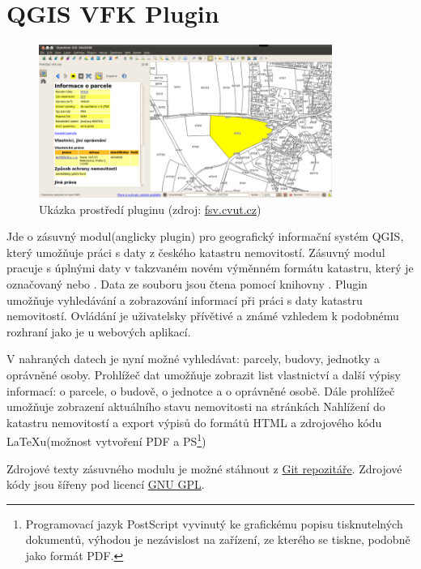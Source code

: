 \section{QGIS VFK Plugin}
\begin{figure}[H]
	 \centering
      \includegraphics[height=5cm]{./pictures/Qgisvfkplugin.png}
      \caption{Ukázka prostředí pluginu (zdroj:
\href{http://freegis.fsv.cvut.cz/wiki/images/4/4b/Qgisvfkplugin-screenshot-05.png}{fsv.cvut.cz})}
      \label{fig:qgis_vfk_plugin}
  \end{figure}

Jde o zásuvný modul(anglicky plugin) pro geografický informační systém QGIS, který umožňuje práci s daty z českého katastru nemovitostí. Zásuvný modul pracuje s úplnými daty v takzvaném novém výměnném formátu katastru, který je označovaný  nebo . Data ze souboru jsou čtena pomocí knihovny . Plugin umožňuje vyhledávání a zobrazování informací při práci s daty katastru nemovitostí. Ovládání je uživatelsky přívětivé a známé vzhledem k podobnému rozhraní jako je u webových aplikací.

V nahraných datech je nyní možné vyhledávat: parcely, budovy, jednotky a oprávněné osoby. Prohlížeč dat umožňuje zobrazit list vlastnictví a další výpisy informací: o parcele, o budově, o jednotce a o oprávněné osobě. Dále prohlížeč umožňuje zobrazení aktuálního stavu nemovitosti na stránkách Nahlížení do katastru nemovitostí a export výpisů do formátů HTML a zdrojového kódu LaTeXu(možnost vytvoření PDF a PS\footnote{Programovací jazyk PostScript vyvinutý ke grafickému popisu tisknutelných dokumentů, výhodou je nezávislost na zařízení, ze kterého se tiskne, podobně jako formát PDF.\cite{PostScript}})

Zdrojové texty zásuvného modulu je možné stáhnout z \href{https://github.com/ctu-geoforall-lab/qgis-vfk-plugin}{Git repozitáře}. Zdrojové kódy jsou šířeny pod licencí \href{https://raw.githubusercontent.com/ctu-osgeorel/qgis-vfk-plugin/master/LICENSE}{GNU GPL}.


